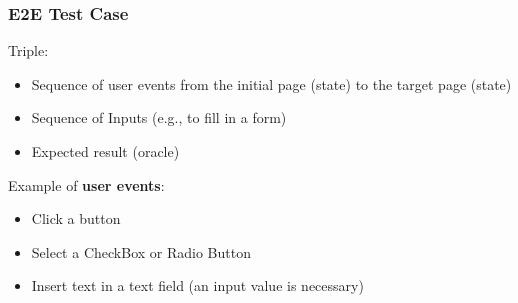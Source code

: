 \documentclass[a4paper, 10pt, titlepage]{article}
\begin{document}
\subsubsection*{E2E Test Case}
Triple:
\begin{itemize}
\item Sequence of user events from the initial page (state) to the target page (state)
\item Sequence of Inputs (e.g., to fill in a form)
\item Expected result (oracle)
\end{itemize}
Example of \textbf{user events}:
\begin{itemize}
\item Click a button
\item Select a CheckBox or Radio Button
\item Insert text in a text field (an input value is necessary)
\end{itemize}
\end{document}
